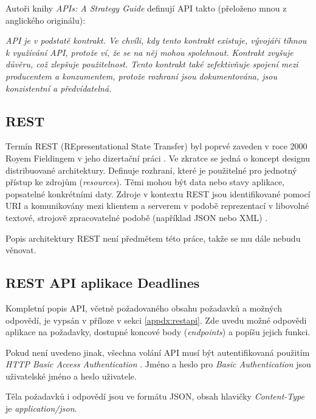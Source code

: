\documentclass[thesis=B,czech]{FITthesis}[2012/06/26]
\begin{document}
			Autoři knihy \textit{APIs: A Strategy Guide} \cite{apis-a-strategy-guide} definují API takto (přeloženo mnou z anglického originálu):
			
			\textit{API je v podstatě kontrakt. Ve chvíli, kdy tento kontrakt existuje, vývojáři tíhnou k využívání API, protože ví, že se na něj mohou spolehnout. Kontrakt zvyšuje důvěru, což zlepšuje použitelnost. Tento kontrakt také zefektivňuje spojení mezi producentem a konzumentem, protože rozhraní jsou dokumentována, jsou konzistentní a předvídatelná.} 
	
		\subsection{REST}
			Termín REST (REpresentational State Transfer) byl poprvé zaveden v roce 2000 Royem Fieldingem v jeho dizertační práci \cite{rest-dissertation}. Ve zkratce se jedná o koncept designu distribuované architektury. Definuje rozhraní, které je použitelné pro jednotný přístup ke zdrojům (\textit{resources}). Těmi mohou být data nebo stavy aplikace, popsatelné konkrétními daty.
			Zdroje v kontextu REST jsou identifikované pomocí URI a komunikovány mezi klientem a serverem v podobě reprezentací v libovolné textové, strojově zpracovatelné podobě (například JSON nebo XML) \cite{rest-youtube}.
			
			Popis architektury REST není předmětem této práce, takže se mu dále nebudu věnovat.
			
		\subsection{REST API aplikace Deadlines}
			Kompletní popis API, včetně požadovaného obsahu požadavků a možných odpovědí, je vypsán v příloze v sekci \ref{appdx:restapi}. Zde uvedu možné odpovědi aplikace na požadavky, dostupné koncové body (\textit{endpoints}) a popíšu jejich funkci. 
			
			Pokud není uvedeno jinak, všechna volání API musí být autentifikovaná použitím \textit{HTTP Basic Access Authentication} \cite{http-basic-auth}. Jméno a heslo pro \textit{Basic Authentication} jsou uživatelské jméno a heslo uživatele.
			
			Těla požadavků i odpovědí jsou ve formátu JSON, obsah hlavičky \textit{Content-Type} je \textit{application/json}.
			
\end{document}
